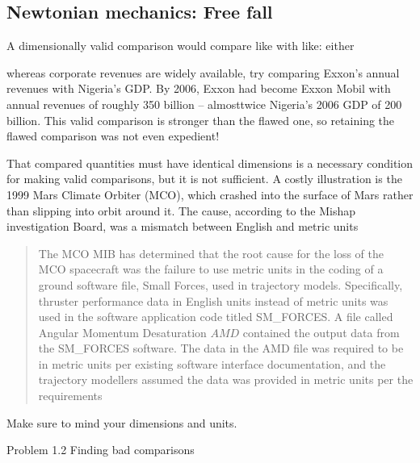 \documentclass[12pt]{article}
\begin{document}
{\bf\subsection{ Newtonian mechanics: Free fall }

A dimensionally valid comparison would compare like with like: either

whereas corporate revenues are widely available, try comparing Exxon’s
annual revenues with Nigeria’s GDP. By 2006, Exxon had become Exxon
Mobil with annual revenues of roughly 350 billion -- almosttwice Nigeria's 2006 GDP of   200 billion. This valid comparison is stronger than the
flawed one, so retaining the flawed comparison was not even expedient!

That compared quantities must have identical dimensions is a necessary
condition for making valid comparisons, but it is not sufficient. A costly
illustration is the 1999 Mars Climate Orbiter (MCO), which crashed into
the surface of Mars rather than slipping into orbit around it. The cause,
according to the Mishap investigation Board, was a mismatch between English and metric units
\begin{quote} The MCO MIB has determined that the root cause for the loss of the MCO
spacecraft was the failure to use metric units in the coding of a ground
software file, Small Forces, used in trajectory models. Specifically, thruster
performance data in English units instead of metric units was used in the
software application code titled SM\_FORCES. A file called Angular Momentum Desaturation \(AMD\) contained the output data from the
SM\_FORCES software. The data in the AMD file was required to be in metric
units per existing software interface documentation, and the trajectory modellers assumed the data was provided in metric units per the requirements
\end{quote}
Make sure to mind your dimensions and units.

Problem 1.2 Finding bad comparisons

}
\end{document}
